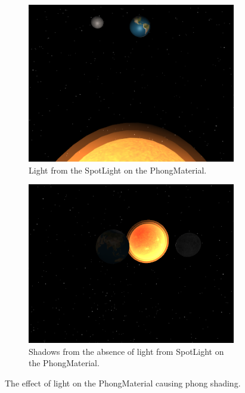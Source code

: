 \documentclass[12pt]{article}
\begin{document}
 \begin{figure}[H]
        \centering
        \begin{subfigure}[b]{0.4\textwidth}
                \includegraphics[width=\textwidth]{images/lightfromphong1}
                \caption{Light from the SpotLight on the PhongMaterial.}
                \label{fig: Light from the SpotLight on the PhongMaterial.}
	 \end{subfigure}
        \begin{subfigure}[b]{0.4\textwidth}
                \includegraphics[width=\textwidth]{images/lightfromphong2}
                \caption{Shadows from the absence of light from SpotLight on the PhongMaterial.}
                \label{fig: Shadows from the absence of light from SpotLight on the PhongMateria.}
	 \end{subfigure}
	 \caption{The effect of light on the PhongMaterial causing phong shading.}
\end{figure}
\end{document}
